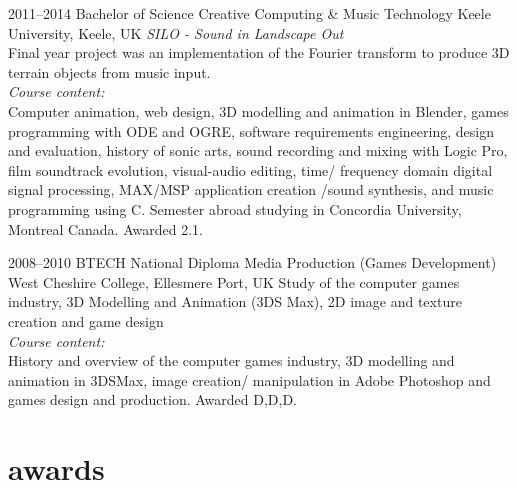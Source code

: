 \documentclass[]{friggeri-cv} %
\begin{document}
\begin{entrylist}


\entry
{2011--2014} 
{Bachelor of Science {\normalfont Creative Computing \& Music Technology}} 
{Keele University, Keele, UK} 
{\emph{SILO - Sound in Landscape Out} \\ Final year project was an implementation of the Fourier transform to produce 3D terrain objects from music input.} \\
{\emph{Course content:} \\ Computer animation, web design, 3D modelling and animation in Blender, games programming with ODE and OGRE, software requirements engineering, design and evaluation, history of sonic arts, sound recording and mixing with Logic Pro, film soundtrack evolution, visual-audio editing, time/ frequency domain digital signal processing, MAX/MSP application creation /sound synthesis, and music programming using C. Semester abroad studying in Concordia University, Montreal Canada. Awarded 2.1.}


\entry
{2008--2010}
{BTECH National Diploma {\normalfont Media Production (Games Development)}}
{West Cheshire College, Ellesmere Port, UK}
{Study of the computer games industry, 3D Modelling and Animation (3DS
Max), 2D image and texture creation and game design} \\
{\emph{Course content:} \\
History and overview of the computer games industry, 3D modelling and animation
in 3DSMax, image creation/ manipulation in Adobe Photoshop and
games design and production. Awarded D,D,D.}


\end{entrylist}




\section{awards}
\end{document}
